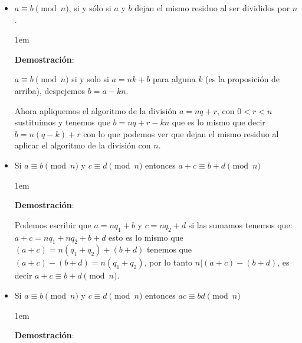 \documentclass[12pt, fleqn]{report}                             %
\newenvironment{SmallIndentation}[1][0.75em]                    %
    {\begin{adjustwidth}{#1}{}\begin{footnotesize}}                 %
    {\end{footnotesize}\end{adjustwidth}}                           %
\begin{document}
\begin{itemize}
\begin{SmallIndentation}[1em]
                    \end{SmallIndentation}

                \item $a \equiv b \pmod{n}$, si y sólo si $a$ y $b$ dejan el mismo
                    residuo al ser divididos por $n$.

                    \begin{SmallIndentation}[1em]
                        \textbf{Demostración}:

                        $a \equiv b \pmod{n}$ si y solo si $a=nk+b$ para alguna $k$ (es
                        la proposición de arriba), despejemos $b=a-kn$.

                        Ahora apliquemos el algoritmo de la división $a=nq+r$, con $0<r<n$
                        sustituimos y tenemos que $b=nq+r -kn$ que es lo mismo que decir
                        $b=n(q-k)+r$ con lo que podemos ver que dejan el mismo residuo al 
                        aplicar el algoritmo de la división con $n$.

                    \end{SmallIndentation}


                \item Si $a \equiv b \pmod{n}$ y $c \equiv d \pmod{n}$ entonces
                        $a+c \equiv b+d \pmod{n}$

                    \begin{SmallIndentation}[1em]
                        \textbf{Demostración}:

                        Podemos escribir que $a=nq_1+b$ y $c=nq_2+d$ si las sumamos tenemos que:
                        $a+c=nq_1 + nq_2 + b+d$ esto es lo mismo que $(a+c)=n(q_1+q_2)+(b+d)$ tenemos que
                        $(a+c) - (b+d) = n(q_1+q_2)$, por lo tanto $n|(a+c) - (b+d)$, es decir
                        $a+c \equiv b+d \pmod{n}$.

                    \end{SmallIndentation}

                \item Si $a \equiv b \pmod{n}$ y $c \equiv d \pmod{n}$ entonces
                        $ac \equiv bd \pmod{n}$

                    \begin{SmallIndentation}[1em]
                        \textbf{Demostración}:


\end{SmallIndentation}
\end{itemize}
\end{document}
